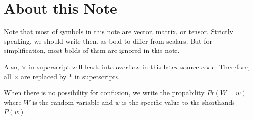 
\chapter{About this Note} \label{sec:intro}

Note that most of symbols in this note are vector, matrix, or tensor.
Strictly speaking, we should write them as bold to differ from scalars.
But for simplification, most bolds of them are ignored in this note.

Also, $\times$ in superscript will leads into overflow in this latex source code.
Therefore, all $\times$ are replaced by $*$ in superscripts.

When there is no possibility for confusion, we write the propability $Pr(W = w)$ where $W$ is the random variable and $w$ is the specific value to the shorthands $P(w)$.

\tododcmmc

